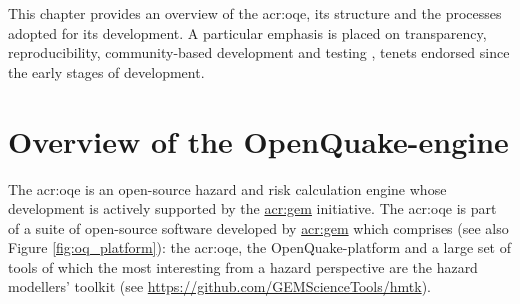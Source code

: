This chapter provides an overview of the \gls{acr:oqe}, 
its structure and the processes adopted for its development. 
A particular emphasis is placed on transparency, reproducibility,
community-based development and testing \parencite{pagani2014}, 
tenets endorsed since the early stages of development. 
%
\section{Overview of the OpenQuake-engine}
%
The \gls{acr:oqe} is an open-source hazard and risk calculation engine 
whose development is actively supported by the 
\href{http://globalquakemodel.org}{\gls{acr:gem}} initiative.
%
The \gls{acr:oqe} is part of a suite of open-source software developed by 
\href{http://globalquakemodel.org}{\gls{acr:gem}} which comprises
(see also Figure \ref{fig:oq_platform}): 
the \gls{acr:oqe}, the OpenQuake-platform and a large set of tools of which 
the most interesting from a hazard perspective are the hazard modellers' 
toolkit (see \href{https://github.com/GEMScienceTools/hmtk}
{https://github.com/GEMScienceTools/hmtk}).

